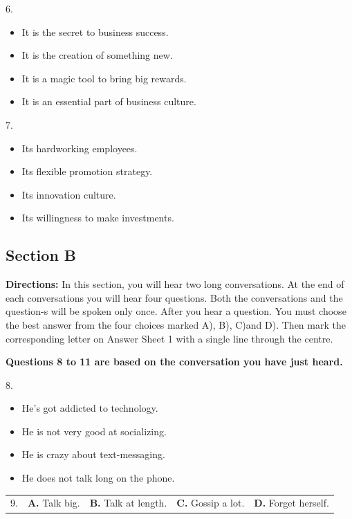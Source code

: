 \documentclass[UTF8,11pt]{ctexart}
\begin{document}
6.


\begin{itemize}[leftmargin=2em,itemsep=.2em,topsep=.4em]\item[A.] It is the secret to business success.
\item[B.] It is the creation of something new.
\item[C.] It is a magic tool to bring big rewards.
\item[D.] It is an essential part of business culture.
\end{itemize}

7.


\begin{itemize}[leftmargin=2em,itemsep=.2em,topsep=.4em]\item[A.] Its hardworking employees.
\item[B.] Its flexible promotion strategy.
\item[C.] Its innovation culture.
\item[D.] Its willingness to make investments.
\end{itemize}

\subsection*{\textbf{Section B}}


\textbf{Directions:} In this section, you will hear two long conversations. At the end of each conversations you will hear four questions. Both the conversations and the question-s will be spoken only once. After you hear a question. You must choose the best answer from the four choices marked A), B), C)and D). Then mark the corresponding letter on Answer Sheet 1 with a single line through the centre.


\textbf{Questions 8 to 11 are based on the conversation you have just heard.}


8.


\begin{itemize}[leftmargin=2em,itemsep=.2em,topsep=.4em]\item[A.] He's got addicted to technology.
\item[B.] He is not very good at socializing.
\item[C.] He is crazy about text-messaging.
\item[D.] He does not talk long on the phone.
\end{itemize}

\noindent\begin{tabularx}{\linewidth}{@{}lXXXX@{}}9. & \textbf{A.} Talk big. & \textbf{B.} Talk at length. & \textbf{C.} Gossip a lot. & \textbf{D.} Forget herself.\\\end{tabularx}\par
\end{document}
